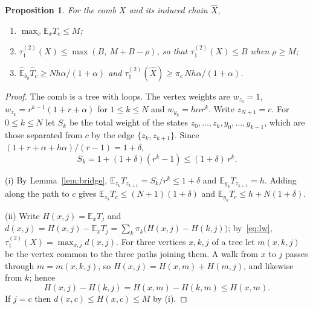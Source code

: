\documentclass[11pt]{amsart}
\newtheorem{proposition}[theorem]{Proposition}
\theoremstyle{definition}
\newcommand{\E}{\mathbb{E}}
\newcommand{\tmix}{\tau_1^{(2)}}
\newcommand{\hE}{\widehat{\E}}
\newcommand{\hX}{\widehat{X}}
\begin{document}
\begin{proposition}\label{prop:comb}
For the comb $X$ and its induced chain $\hX$,
\begin{enumerate}
\item[(i)] $\max_x\E_xT_c\le M$;
\item[(ii)] $\tmix(X)\le\max(B,\ M+B-\rho)$, so that $\tmix(X)\le B$ when $\rho\ge M$;
\item[(iii)] $\hE_{b_0}\widehat{T}_c\ge Nh\alpha/(1+\alpha)$ and $\tmix(\hX)\ge\pi_c\,Nh\alpha/(1+\alpha)$.
\end{enumerate}
\end{proposition}

\begin{proof}
The comb is a tree with loops. The vertex weights are $w_{z_0}=1$, $w_{z_k}=r^{k-1}(1+r+\alpha)$ for
$1\le k\le N$ and $w_{y_k}=h\alpha r^k$. Write $z_{N+1}=c$. For $0\le k\le N$ let $S_k$ be the total weight of the
states $z_0,\dots,z_k,y_0,\dots,y_{k-1}$, which are those separated from $c$ by the edge $\{z_k,z_{k+1}\}$. Since
$(1+r+\alpha+h\alpha)/(r-1)=1+\delta$,
\begin{equation}\label{eq:Sk}
S_k=1+(1+\delta)(r^k-1)\le(1+\delta)\,r^k .
\end{equation}

(i) By Lemma~\ref{lem:bridge}, $\E_{z_k}T_{z_{k+1}}=S_k/r^k\le1+\delta$ and $\E_{y_k}T_{z_{k+1}}=h$. Adding along the
path to $c$ gives $\E_{z_k}T_c\le(N+1)(1+\delta)$ and $\E_{y_k}T_c\le h+N(1+\delta)$.

(ii) Write $H(x,j)=\E_xT_j$ and $d(x,j)=H(x,j)-\E_\pi T_j=\sum_k\pi_k\bigl(H(x,j)-H(k,j)\bigr)$; by~\eqref{eq:lw},
$\tmix(X)=\max_{x,j}d(x,j)$. For three vertices $x,k,j$ of a tree let $m(x,k,j)$ be the vertex common to the three
paths joining them. A walk from $x$ to $j$ passes through $m=m(x,k,j)$, so $H(x,j)=H(x,m)+H(m,j)$, and likewise from
$k$; hence
\begin{equation}\label{eq:median}
H(x,j)-H(k,j)=H(x,m)-H(k,m)\le H(x,m).
\end{equation}
If $j=c$ then $d(x,c)\le H(x,c)\le M$ by (i).


\end{proof}
\end{document}
